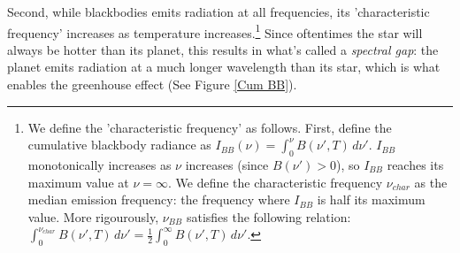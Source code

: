 Second, while blackbodies emits radiation at all frequencies, its 'characteristic frequency' increases as temperature increases.\footnote{
    We define the 'characteristic frequency' as follows. First, define the cumulative blackbody radiance as $I_{BB}(\nu)=\int_0^\nu B(\nu',T)\,d\nu'$. $I_{BB}$ monotonically increases as $\nu$ increases (since $B(\nu')>0$), so $I_{BB}$ reaches its maximum value at $\nu=\infty$. We define the characteristic frequency $\nu_{char}$ as the median emission frequency: the frequency where $I_{BB}$ is half its maximum value. More rigourously, $\nu_{BB}$ satisfies the following relation: $\int_0^{\nu_{char}} B(\nu',T)\,d\nu'=\frac{1}{2}\int_0^\infty B(\nu',T)\,d\nu'$.\footnotemark
} 
Since oftentimes the star will always be hotter than its planet, this results in what's called a \textit{spectral gap}: the planet emits radiation at a much longer wavelength than its star, which is what enables the greenhouse effect (See Figure \ref{Cum BB}).

